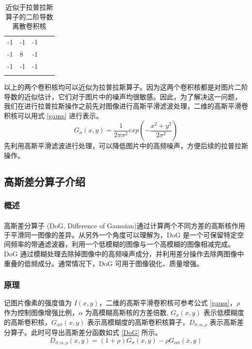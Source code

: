 \documentclass[12pt, a4paper, oneside]{ctexbook}
\begin{document}
	\begin{table}[h]
		\centering
		\begin{tabular}{lllll}
			\cline{1-3}
			\multicolumn{1}{|l|}{-1} & \multicolumn{1}{l|}{-1} & \multicolumn{1}{l|}{-1} &  &  \\ \cline{1-3}
			\multicolumn{1}{|l|}{-1} & \multicolumn{1}{l|}{8}  & \multicolumn{1}{l|}{-1} &  &  \\ \cline{1-3}
			\multicolumn{1}{|l|}{-1} & \multicolumn{1}{l|}{-1} & \multicolumn{1}{l|}{-1} &  &  \\ \cline{1-3}
			&                         &                         &  & 
		\end{tabular}
		\caption{近似于拉普拉斯算子的二阶导数离散卷积核}
	\end{table}
	以上的两个卷积核均可以近似为拉普拉斯算子。因为这两个卷积核都是对图片二阶导数的近似估计，它们对于图片中的噪声均很敏感。因此，为了解决这一问题，
	我们在进行拉普拉斯操作之前先对图像进行高斯平滑滤波处理，二维的高斯平滑卷积核可以用式 \ref{gauss} 进行表示。
	\begin{equation}	\label{gauss}
		G_\sigma (x,y)=\frac{1}{2\pi \sigma ^2} exp(-\frac{x^2+y^2}{2\sigma ^2}) 
	\end{equation}
	先利用高斯平滑滤波进行处理，可以降低图片中的高频噪声，方便后续的拉普拉斯操作。
	
	\subsection{高斯差分算子介绍}
	\subsubsection{概述}
	高斯差分算子 (DoG, Difference of Gaussian)\textsuperscript{\cite{14}}通过计算两个不同方差的高斯核作用于平滑同一图像的差异。从另外一个角度可以理解为，DoG 是一个可保留特定空间频率的带通滤波器，利用一个低模糊的图像与一个高模糊的图像相减完成。DoG 通过模糊处理去除掉图像中的高频噪声成分，并利用差分操作去除两图像中重叠的低频成分。通常情况下，DoG 可用于图像锐化、质量增强。
	\subsubsection{原理}
	记图片像素的强度值为 $I(x,y)$，二维的高斯平滑卷积核可参考公式 \ref{gauss}，$\rho$ 作为控制图像增强比例，$\alpha$ 为高模糊高斯核的方差倍数, $G_{\sigma}(x,y)$ 表示低模糊度的高斯卷积核，$G_{\alpha\sigma}(x,y)$ 表示高模糊度的高斯卷积核算子，$D_{\sigma,\alpha,\rho}$ 表示高斯差分算子。此时可导出高斯差分函数如式 \ref{DoG} 所示。
	\begin{equation} \label{DoG}
		D_{\sigma,\alpha,\rho}(x,y)=(1+\rho)G_{\sigma}(x,y)-\rho G_{\alpha\sigma}(x,y)
	\end{equation}
	
\end{document}
